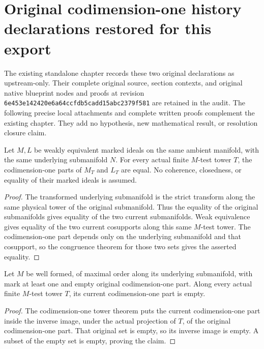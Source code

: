 \section{Original codimension-one history declarations restored for this export}

The existing standalone chapter records these two original declarations as
upstream-only. Their complete original source, section contexts, and original
native blueprint nodes and proofs at revision
\texttt{6e453e142420e6a64ccfdb5cadd15abc2379f581} are retained in the audit.
The following precise local attachments and complete written proofs complement
the existing chapter. They add no hypothesis, new mathematical result, or
resolution closure claim.

\begin{lemma}
\label{hir:additive-export-codim-equivalence-history}
\leanok
Let $M,L$ be weakly equivalent marked ideals on the same ambient manifold,
with the same underlying submanifold $N$. For every actual finite $M$-test
tower $T$, the codimension-one parts of $M_T$ and $L_T$ are equal.
No coherence, closedness, or equality of their marked ideals is assumed.
\end{lemma}
\begin{proof}
The transformed underlying submanifold is the strict transform along the
same physical tower of the original submanifold. Thus the equality of the
original submanifolds gives equality of the two current submanifolds.
Weak equivalence gives equality of the two current cosupports along this
same $M$-test tower. The codimension-one part depends only on the underlying
submanifold and that cosupport, so the congruence theorem for those two sets
gives the asserted equality.
\end{proof}

\begin{lemma}
\label{hir:additive-export-codim-empty-history}
\leanok
Let $M$ be well formed, of maximal order along its underlying submanifold,
with mark at least one and empty original codimension-one part. Along every
actual finite $M$-test tower $T$, its current codimension-one part is empty.
\end{lemma}
\begin{proof}
The codimension-one tower theorem puts the current codimension-one part
inside the inverse image, under the actual projection of $T$, of the
original codimension-one part. That original set is empty, so its inverse
image is empty. A subset of the empty set is empty, proving the claim.
\end{proof}
